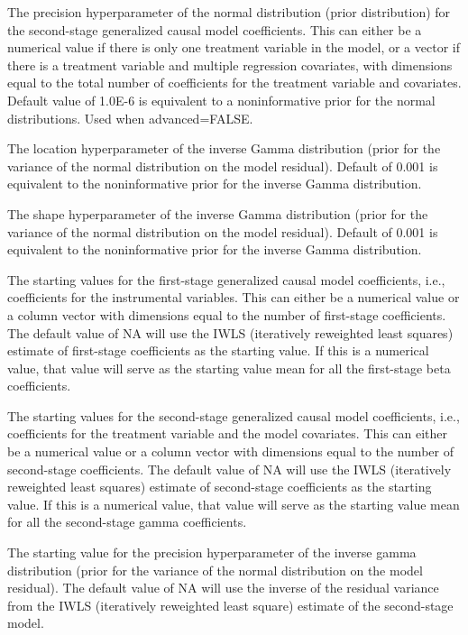 \documentclass[a4paper]{book}
\begin{document}
\begin{Arguments}
\begin{ldescription}
\item[\code{G0}] The precision hyperparameter of the normal distribution (prior distribution)
for the second-stage generalized causal model coefficients.
This can either be a numerical value if there is only one treatment variable in the model,
or a vector if there is a treatment variable and multiple regression covariates,
with dimensions equal to the total number of coefficients for the treatment variable and covariates.
Default value of 1.0E-6 is equivalent to a noninformative prior for the normal distributions.
Used when advanced=FALSE.

\item[\code{e0}] The location hyperparameter of the inverse Gamma distribution (prior for the variance of the
normal distribution on the model residual).
Default of 0.001 is equivalent to the noninformative prior for the inverse Gamma distribution.

\item[\code{E0}] The shape hyperparameter of the inverse Gamma distribution (prior for the variance of the
normal distribution on the model residual).
Default of 0.001 is equivalent to the noninformative prior for the inverse Gamma distribution.

\item[\code{beta.start}] The starting values for the first-stage generalized causal model coefficients,
i.e., coefficients for the instrumental variables.
This can either be a numerical value or a column vector with dimensions
equal to the number of first-stage coefficients.
The default value of NA will use the IWLS (iteratively reweighted least squares) estimate
of first-stage coefficients as the starting value.
If this is a numerical value, that value will
serve as the starting value mean for all the first-stage beta coefficients.

\item[\code{gamma.start}] The starting values for the second-stage generalized causal model coefficients,
i.e., coefficients for the treatment variable and the model covariates.
This can either be a numerical value or a column vector with dimensions
equal to the number of second-stage coefficients.
The default value of NA will use the IWLS (iteratively reweighted least squares) estimate
of second-stage coefficients as the starting value.
If this is a numerical value, that value will
serve as the starting value mean for all the second-stage gamma coefficients.

\item[\code{e.start}] The starting value for the precision hyperparameter of the inverse gamma distribution
(prior for the variance of the normal distribution on the model residual).
The default value of NA will use the inverse of the residual variance from the
IWLS (iteratively reweighted least square) estimate of the second-stage model.


\end{ldescription}
\end{Arguments}
\end{document}
